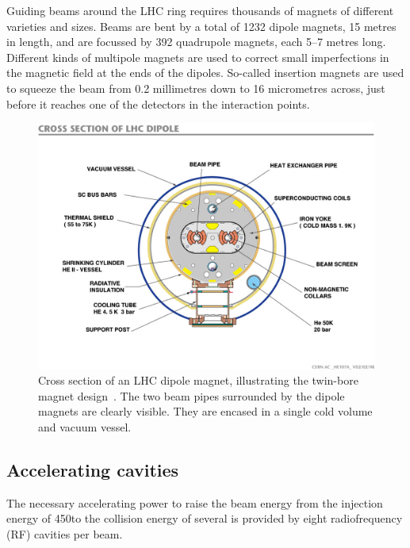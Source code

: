 Guiding beams around the LHC ring requires thousands of magnets of different varieties and sizes.
Beams are bent by a total of 1232 dipole magnets, 15 metres in length, and are focussed by 392
quadrupole magnets, each 5–7 metres long. Different kinds of multipole magnets are used to correct
small imperfections in the magnetic field at the ends of the dipoles. So-called insertion magnets
are used to squeeze the beam from 0.2 millimetres down to 16 micrometres across, just before it
reaches one of the detectors in the interaction points. 

\begin{figure}[t]
  \centering
  \includegraphics[width=\textwidth,clip=true,trim=0 2cm 0 2cm]
  {figures/lhc/lhc_dipole_cross_section_cds841539.jpg} 
  \caption{Cross section of an LHC dipole magnet, illustrating the twin-bore magnet
design~\cite{cds:841539}. The two beam pipes surrounded by the dipole magnets are clearly
visible. They are encased in a single cold volume and vacuum vessel. 
  \label{fig:lhc_twin_bore}}
\end{figure}


\subsection{Accelerating cavities}

The necessary accelerating power to raise the beam energy from the injection energy of 450\GeV to
the collision energy of several \TeV is provided by eight radiofrequency (RF) cavities per beam. 

